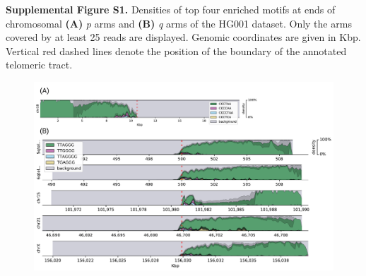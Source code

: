\documentclass{article}
\begin{document}

\noindent \textbf{Supplemental Figure S1.}
Densities of top four enriched motifs at ends of chromosomal \textbf{(A)} \textit{p} arms and \textbf{(B)} \textit{q} arms of the HG001 dataset.
Only the arms covered by at least 25 reads are displayed.
Genomic coordinates are given in Kbp.
Vertical red dashed lines denote the position of the boundary of the annotated telomeric tract.

\begin{figure}[h] \centering
\includegraphics[width=\textwidth,keepaspectratio]{renders/figures/Figure-S1.pdf}
\end{figure}
\end{document}
